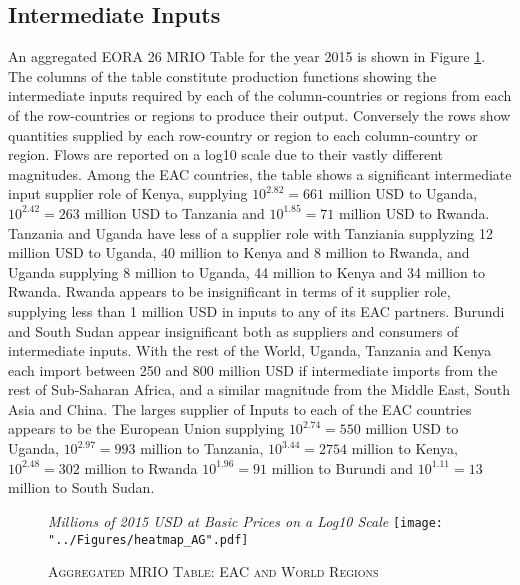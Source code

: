 \documentclass[a4paper]{article}
\begin{document}
\subsection{Intermediate Inputs}
An aggregated EORA 26 MRIO Table for the year 2015 is shown in Figure \ref{fig:wld}.  The columns of the table constitute production functions showing the intermediate inputs required by each of the column-countries or regions from each of the row-countries or regions to produce their output. Conversely the rows show quantities supplied by each row-country or region to each column-country or region. Flows are reported on a log10 scale due to their vastly different magnitudes. Among the EAC countries, the table shows a significant intermediate input supplier role of Kenya, supplying $10^{2.82} = 661$ million USD to Uganda, $10^{2.42} = 263$ million USD to Tanzania and  $10^{1.85} = 71$ million USD to Rwanda. Tanzania and Uganda have less of a supplier role with Tanziania supplyzing 12 million USD to Uganda, 40 million to Kenya and 8 million to Rwanda, and Uganda supplying 8 million to Uganda, 44 million to Kenya and 34 million to Rwanda. Rwanda appears to be insignificant in terms of it supplier role, supplying less than 1 million USD in inputs to any of its EAC partners. Burundi and South Sudan appear insignificant both as suppliers and consumers of intermediate inputs. With the rest of the World, Uganda, Tanzania and Kenya each import between 250 and 800 million USD if intermediate imports from the rest of Sub-Saharan Africa, and a similar magnitude from the Middle East, South Asia and China. The larges supplier of Inputs to each of the EAC countries appears to be the European Union supplying $10^{2.74} = 550$ million USD to Uganda, $10^{2.97} = 993$ million to Tanzania, $10^{3.44} = 2754$ million to Kenya, $10^{2.48} = 302$ million to Rwanda  $10^{1.96} = 91$ million to Burundi and $10^{1.11} = 13$ million to South Sudan. 

\begin{figure}[h!]
\centering
\caption{\label{fig:wld}\textsc{Aggregated MRIO Table: EAC and World Regions}}
\small{\textit{Millions of 2015 USD at Basic Prices on a Log10 Scale}}
\texttt{[image: "../Figures/heatmap\_AG".pdf]} %
\end{figure}
\FloatBarrier
\end{document}
